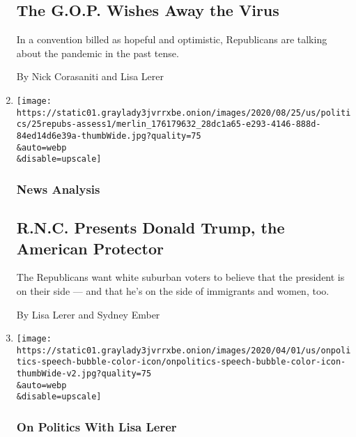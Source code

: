 \begin{enumerate}
  \hypertarget{the-gop-wishes-away-the-virus}{%
  \subsection{The G.O.P. Wishes Away the
  Virus}\label{the-gop-wishes-away-the-virus}}

  In a convention billed as hopeful and optimistic, Republicans are
  talking about the pandemic in the past tense.

  By Nick Corasaniti and Lisa Lerer
\item
  \href{/2020/08/26/us/politics/trump-convention-night-2.html}{}

  \texttt{[image: https://static01.graylady3jvrrxbe.onion/images/2020/08/25/us/politics/25repubs-assess1/merlin\_176179632\_28dc1a65-e293-4146-888d-84ed14d6e39a-thumbWide.jpg?quality=75\\\&auto=webp\\\&disable=upscale]}

  \hypertarget{news-analysis}{%
  \subsubsection{News Analysis}\label{news-analysis}}

  \hypertarget{rnc-presents-donald-trump-the-american-protector}{%
  \subsection{R.N.C. Presents Donald Trump, the American
  Protector}\label{rnc-presents-donald-trump-the-american-protector}}

  The Republicans want white suburban voters to believe that the
  president is on their side --- and that he's on the side of immigrants
  and women, too.

  By Lisa Lerer and Sydney Ember
\item
  \href{/2020/08/25/us/politics/revisionist-history-at-the-rnc.html}{}

  \texttt{[image: https://static01.graylady3jvrrxbe.onion/images/2020/04/01/us/onpolitics-speech-bubble-color-icon/onpolitics-speech-bubble-color-icon-thumbWide-v2.jpg?quality=75\\\&auto=webp\\\&disable=upscale]}

  \hypertarget{on-politics-with-lisa-lerer-3}{%
  \subsubsection{On Politics With Lisa
  Lerer}\label{on-politics-with-lisa-lerer-3}}

  \hypertarget{revisionist-history-at-the-rnc}{%
}
\end{enumerate}
